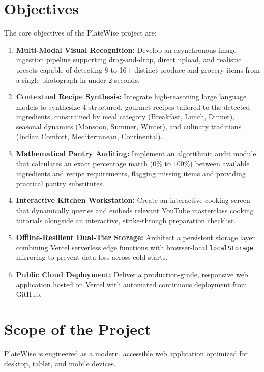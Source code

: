 \section{Objectives}
The core objectives of the PlateWise project are:
\begin{enumerate}
    \item \textbf{Multi-Modal Visual Recognition:} Develop an asynchronous image ingestion pipeline supporting drag-and-drop, direct upload, and realistic presets capable of detecting 8 to 16+ distinct produce and grocery items from a single photograph in under 2 seconds.
    \item \textbf{Contextual Recipe Synthesis:} Integrate high-reasoning large language models to synthesize 4 structured, gourmet recipes tailored to the detected ingredients, constrained by meal category (Breakfast, Lunch, Dinner), seasonal dynamics (Monsoon, Summer, Winter), and culinary traditions (Indian Comfort, Mediterranean, Continental).
    \item \textbf{Mathematical Pantry Auditing:} Implement an algorithmic audit module that calculates an exact percentage match ($0\%$ to $100\%$) between available ingredients and recipe requirements, flagging missing items and providing practical pantry substitutes.
    \item \textbf{Interactive Kitchen Workstation:} Create an interactive cooking screen that dynamically queries and embeds relevant YouTube masterclass cooking tutorials alongside an interactive, strike-through preparation checklist.
    \item \textbf{Offline-Resilient Dual-Tier Storage:} Architect a persistent storage layer combining Vercel serverless edge functions with browser-local \texttt{localStorage} mirroring to prevent data loss across cold starts.
    \item \textbf{Public Cloud Deployment:} Deliver a production-grade, responsive web application hosted on Vercel with automated continuous deployment from GitHub.
\end{enumerate}

\section{Scope of the Project}
PlateWise is engineered as a modern, accessible web application optimized for desktop, tablet, and mobile devices. 

